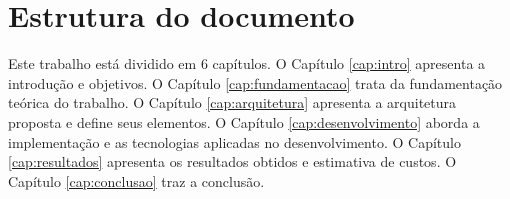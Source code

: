 \section{ Estrutura do documento}
Este trabalho está dividido em 6 capítulos. O Capítulo \ref{cap:intro} apresenta a introdução e objetivos. O Capítulo \ref{cap:fundamentacao} trata da fundamentação teórica do trabalho. O Capítulo \ref{cap:arquitetura} apresenta a arquitetura proposta e define seus elementos. O Capítulo \ref{cap:desenvolvimento} aborda a implementação e as tecnologias aplicadas no desenvolvimento. O Capítulo \ref{cap:resultados} apresenta os resultados obtidos e estimativa de custos. O Capítulo \ref{cap:conclusao} traz a conclusão.